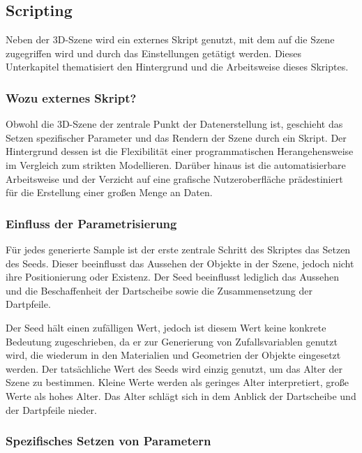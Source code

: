 
\subsection{Scripting}  %
\label{sec:scripting}

Neben der 3D-Szene wird ein externes Skript genutzt, mit dem auf die Szene zugegriffen wird und durch das Einstellungen getätigt werden. Dieses Unterkapitel thematisiert den Hintergrund und die Arbeitsweise dieses Skriptes.

\subsubsection{Wozu externes Skript?}

Obwohl die 3D-Szene der zentrale Punkt der Datenerstellung ist, geschieht das Setzen spezifischer Parameter und das Rendern der Szene durch ein Skript. Der Hintergrund dessen ist die Flexibilität einer programmatischen Herangehensweise im Vergleich zum strikten Modellieren. Darüber hinaus ist die automatisierbare Arbeitsweise und der Verzicht auf eine grafische Nutzeroberfläche prädestiniert für die Erstellung einer großen Menge an Daten.

\subsubsection{Einfluss der Parametrisierung}

Für jedes generierte Sample ist der erste zentrale Schritt des Skriptes das Setzen des Seeds. Dieser beeinflusst das Aussehen der Objekte in der Szene, jedoch nicht ihre Positionierung oder Existenz. Der Seed beeinflusst lediglich das Aussehen und die Beschaffenheit der Dartscheibe sowie die Zusammensetzung der Dartpfeile.

Der Seed hält einen zufälligen Wert, jedoch ist diesem Wert keine konkrete Bedeutung zugeschrieben, da er zur Generierung von Zufallsvariablen genutzt wird, die wiederum in den Materialien und Geometrien der Objekte eingesetzt werden. Der tatsächliche Wert des Seeds wird einzig genutzt, um das Alter der Szene zu bestimmen. Kleine Werte werden als geringes Alter interpretiert, große Werte als hohes Alter. Das Alter schlägt sich in dem Anblick der Dartscheibe und der Dartpfeile nieder.

\subsubsection{Spezifisches Setzen von Parametern}

